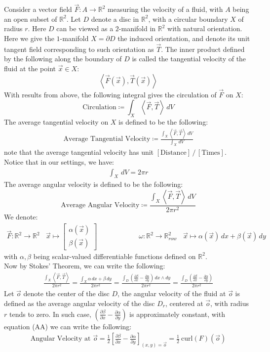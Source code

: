 \documentclass[11pt,oneside]{book}
\theoremstyle{break}
\theoremstyle{break}
\newcommand{\R}{\mathbb{R}}
\newcommand{\pd}{\partial}
\newcommand{\bmat}[1]{\begin{bmatrix} #1 \end{bmatrix}}
\begin{document}
Consider a vector field $\vec{F}:A \to \R^2$  measuring the velocity of a fluid, with $A$ being an open subset of $\R^2$. Let $D$ denote a disc in $\R^2$, with a circular boundary $X$ of radius $r$. Here $D$ can be viewed as a $2$-manifold in $\R^2$ with natural orientation. Here we give the $1$-manifold $X=\partial D$ the induced orientation, and denote its unit tangent field corresponding to such orientation as $\vec{T}$. The inner product defined by the following along the boundary of $D$ is called the tangential velocity of the fluid at the point $\vec{x}\in X$: 
$$\left<\vec{F}(\vec{x}), \vec{T}(\vec{x})\right>$$  
With results from above, the following integral gives the circulation of $\vec{F}$ on $X$:
$$\text{Circulation} \coloneqq \int_X \left< \vec{F}, \vec{T}\right>\, dV$$
The average tangential velocity on $X$ is defined to be the following:
\begin{align*}
\text{Average Tangential Velocity} \coloneqq \frac{\int_X \left< \vec{F},\vec{T}\right> \, dV}{\int_X \, dV} 
\end{align*}
note that the average tangential velocity has unit $[\text{Distance}]\,/\,[\text{Times}]$. \\Notice that in our settings, we have:
\begin{align*}
\int_X \, dV = 2\pi r
\end{align*}
The average angular velocity is defined to be the following:
$$\text{Average Angular Velocity} \coloneqq \frac{\int_X \left< \vec{F}, \vec{T}\right>\, dV}{ 2\pi r^2}$$
We denote:
\begin{align*}
\vec{F}:\R^2 \to \R^2 \ \ \ \ \vec{x}\mapsto \bmat{\alpha(\vec{x})\\ \beta(\vec{x})}\qquad\qquad\qquad \omega:\R^2\to \R^2_{row} \ \ \ \ \vec{x}\mapsto \alpha(\vec{x})\, dx +\beta(\vec{x}) \, dy
\end{align*}
with $\alpha,\beta$ being scalar-valued differentiable functions defined on $\R^2$. \\
Now by Stokes' Theorem, we can write the following:
\begin{align*}
\frac{\int_X \left< \vec{F}, \vec{T}\right>}{ 2\pi r^2} = \frac{\int_X \alpha\, dx + \beta\, dy}{2\pi r^2} = \frac{\int_D \left(\frac{\pd \beta}{\pd x}- \frac{\pd \alpha}{\pd y}\right)\, dx\wedge dy}{2\pi r^2} = \frac{\int_{D} \left(\frac{\pd \beta}{\pd x}- \frac{\pd \alpha}{\pd y}\right)}{2\pi r^2}  \tag{AA}
\end{align*}
Let $\vec{o}$ denote the center of the disc $D$, the angular velocity of the fluid at $\vec{o}$ is defined as the average angular velocity of the disc $D_r$, centered at $\vec{o}$, with radius $r$ tends to zero. In such case, $(\frac{\pd \beta}{\pd x}- \frac{\pd \alpha}{\pd y})$ is approximately constant, with equation (AA) we can write the following:
\begin{align*}
\text{Angular Velocity at }\vec{o} = \frac{1}{2} \left[\frac{\pd \beta}{\pd x}- \frac{\pd \alpha}{\pd y}\right]_{(x,y) = \vec{o}} = \frac{1}{2}\ \text{curl}(F)(\vec{o})
\end{align*}
\end{document}
